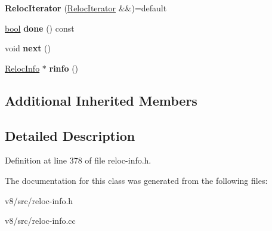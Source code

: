 \begin{DoxyCompactItemize}
\item 
\mbox{\label{classv8_1_1internal_1_1RelocIterator_a4dbbea7d32c608399113d9f6d6e6c1ce}} 
{\bfseries Reloc\+Iterator} (\mbox{\hyperlink{classv8_1_1internal_1_1RelocIterator}{Reloc\+Iterator}} \&\&)=default
\item 
\mbox{\label{classv8_1_1internal_1_1RelocIterator_ab23796f1ed69d2d187fe09231961194c}} 
\mbox{\hyperlink{classbool}{bool}} {\bfseries done} () const
\item 
\mbox{\label{classv8_1_1internal_1_1RelocIterator_a92fcd0e86152eb3899352f7766b8bc05}} 
void {\bfseries next} ()
\item 
\mbox{\label{classv8_1_1internal_1_1RelocIterator_ac53f8a0cca6a7cc37f667295dfda7aea}} 
\mbox{\hyperlink{classv8_1_1internal_1_1RelocInfo}{Reloc\+Info}} $\ast$ {\bfseries rinfo} ()
\end{DoxyCompactItemize}
\subsection*{Additional Inherited Members}


\subsection{Detailed Description}


Definition at line 378 of file reloc-\/info.\+h.



The documentation for this class was generated from the following files\+:\begin{DoxyCompactItemize}
\item 
v8/src/reloc-\/info.\+h\item 
v8/src/reloc-\/info.\+cc\end{DoxyCompactItemize}
